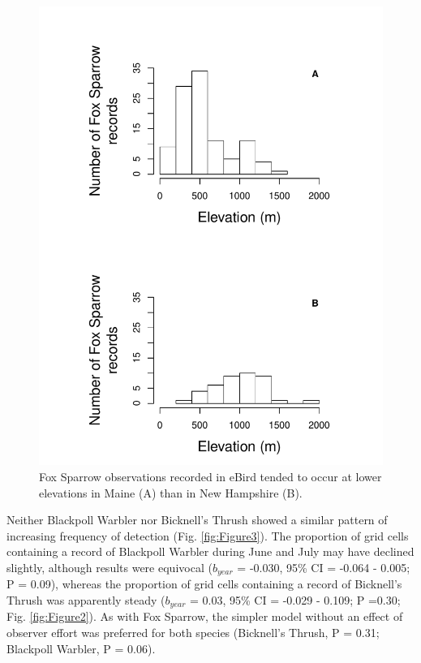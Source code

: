 \documentclass[fleqn,10pt,lineno]{wlpeerj} %
\begin{document}
\begin{figure}[ht]\centering
\includegraphics[width=\linewidth]{Figure4}
\caption{Fox Sparrow observations recorded in eBird tended to occur at lower elevations in Maine (A) than in New Hampshire (B).}
\label{fig:Figure4}
\end{figure}

Neither Blackpoll Warbler nor Bicknell’s Thrush showed a similar pattern of increasing frequency of detection (Fig. \ref{fig:Figure3}). The proportion of grid cells containing a record of Blackpoll Warbler during June and July may have declined slightly, although results were equivocal ($b_{year}$ = -0.030, 95\% CI = -0.064 - 0.005; P = 0.09), whereas the proportion of grid cells containing a record of Bicknell’s Thrush was apparently steady ($b_{year}$ = 0.03, 95\% CI = -0.029 - 0.109; P =0.30; Fig. \ref{fig:Figure2}). As with Fox Sparrow, the simpler model without an effect of observer effort was preferred for both species (Bicknell’s Thrush, P = 0.31; Blackpoll Warbler, P = 0.06). 
\end{document}
